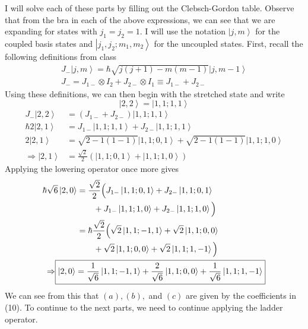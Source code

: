 \documentclass[a4paper, 11pt]{article}
\newcommand{\ket}[1]{\ensuremath{\left|#1\right\rangle}}
\newenvironment{solution}{%
	\begin{list}{}{%
			\setlength{\topsep}{0pt}%
			\setlength{\leftmargin}{0.5cm}%
			\setlength{\rightmargin}{0.5cm}%
			\setlength{\listparindent}{\parindent}%
			\setlength{\itemindent}{\parindent}%
			\setlength{\parsep}{\parskip}%
		}%
		\item[]}{\end{list}}
\begin{document}
\begin{enumerate}[leftmargin=0em]
    \begin{solution}
      I will solve each of these parts by filling out the Clebsch-Gordon table.
      Observe that from the bra in each of the above expressions, we can see
      that we are expanding for states with $j_1=j_2=1$. I will use the notation
      $\ket{j,m}$ for the coupled basis states and $\ket{j_1,j_2;m_1,m_2}$ for
      the uncoupled states. First, recall the following definitions from class
      \begin{align}
        J_-\ket{j,m} = \hbar\sqrt{j(j+1)-m(m-1)}\ket{j, m-1}\\
        J_- = J_{1-}\otimes I_2 + J_{2-}\otimes I_1 \equiv J_{1-}+J_{2-}
      \end{align}
      Using these definitions, we can then begin with the stretched state and
      write
      \begin{equation}
        \ket{2,2} = \ket{1,1;1,1}
      \end{equation}
      \begin{align}
        J_-\ket{2,2} &= (J_{1-}+J_{2-})\ket{1,1;1,1} \\
        \hbar2\ket{2,1} &= J_{1-}\ket{1,1;1,1}+J_{2-}\ket{1,1;1,1}\\
        2\ket{2,1} &= \sqrt{2-1(1-1)}\ket{1,1;0,1}+\sqrt{2-1(1-1)}\ket{1,1;1,0} \\
        \Rightarrow \ket{2,1} &= \frac{\sqrt{2}}{2}\left( \ket{1,1;0,1}+\ket{1,1;1,0} \right)
      \end{align}
      Applying the lowering operator once more gives
      \begin{align}
          \hbar\sqrt{6}\ket{2,0} &= \frac{\sqrt{2}}{2} \Big(J_{1-}\ket{1,1;0,1}+J_{2-}\ket{1,1;0,1}\\
          &\qquad +J_{1-}\ket{1,1;1,0}+J_{2-}\ket{1,1;1,0} \Big) \notag\\
                                 &= \hbar\frac{\sqrt{2}}{2}\Big(\sqrt{2}\ket{1,1;-1,1} +\sqrt{2}\ket{1,1;0,0} \\
                                 &\qquad + \sqrt{2}\ket{1,1;0,0}+\sqrt{2}\ket{1,1;1,-1}\Big) \notag\\
        \Rightarrow \Aboxed{\ket{2,0} &= \frac{1}{\sqrt{6}}\ket{1,1;-1,1}+\frac{2}{\sqrt{6}}\ket{1,1;0,0}+\frac{1}{\sqrt{6}}\ket{1,1;1,-1}   }
      \end{align}
      We can see from this that $(a), (b),$ and $(c)$ are given by the
      coefficients in (10). To continue to the next parts, we need to continue
      applying the ladder operator.
      \begin{align}

\end{align}
\end{solution}
\end{enumerate}
\end{document}
